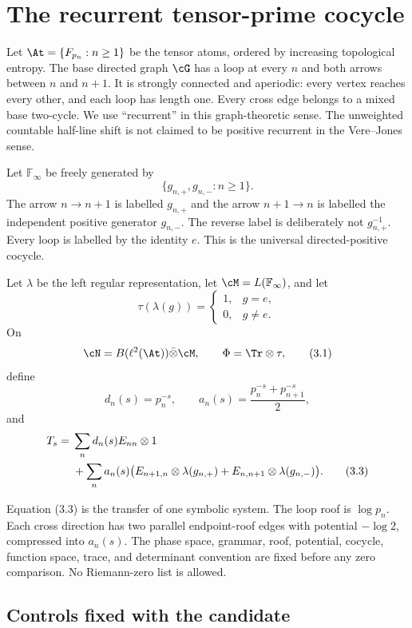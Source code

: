 \section{The recurrent tensor-prime cocycle}
\label{sec:source}

Let $\At=\{F_{p_n}:n\ge1\}$ be the tensor atoms, ordered by increasing
topological entropy.  The base directed graph $\cG$ has a loop at every $n$
and both arrows between $n$ and $n+1$.  It is strongly connected and
aperiodic: every vertex reaches every other, and each loop has length one.
Every cross edge belongs to a mixed base two-cycle.  We use ``recurrent'' in
this graph-theoretic sense.  The unweighted countable half-line shift is not
claimed to be positive recurrent in the Vere--Jones sense.

Let $\mathbb F_\infty$ be freely generated by
\[
 \{g_{n,+},g_{n,-}:n\ge1\}.
\]
The arrow $n\to n+1$ is labelled $g_{n,+}$ and the arrow
$n+1\to n$ is labelled the independent positive generator $g_{n,-}$.
The reverse label is deliberately not $g_{n,+}^{-1}$.  Every loop is labelled
by the identity $e$.  This is the universal directed-positive cocycle.

Let $\lambda$ be the left regular representation, let
$\cM=L(\mathbb F_\infty)$, and let
\[
 \tau(\lambda(g))=\begin{cases}1,&g=e,\\0,&g\ne e.\end{cases}
\]
On
\[
 \cN=B(\ell^2(\At))\bar\otimes\cM,
 \qquad \Phi=\Tr\otimes\tau,                 \tag{3.1}
\]
define
\[
 d_n(s)=p_n^{-s},\qquad
 a_n(s)=\frac{p_n^{-s}+p_{n+1}^{-s}}2,        \tag{3.2}
\]
and
\begin{align}
 T_s={}&\sum_nd_n(s)E_{nn}\otimes1 \notag\\
 &+\sum_na_n(s)\bigl(
 E_{n+1,n}\otimes\lambda(g_{n,+})
 +E_{n,n+1}\otimes\lambda(g_{n,-})\bigr).   \tag{3.3}
\end{align}

Equation (3.3) is the transfer of one symbolic system.  The loop roof is
$\log p_n$.  Each cross direction has two parallel endpoint-roof edges with
potential $-\log2$, compressed into $a_n(s)$.  The phase space, grammar,
roof, potential, cocycle, function space, trace, and determinant convention
are fixed before any zero comparison.  No Riemann-zero list is allowed.

\subsection{Controls fixed with the candidate}

